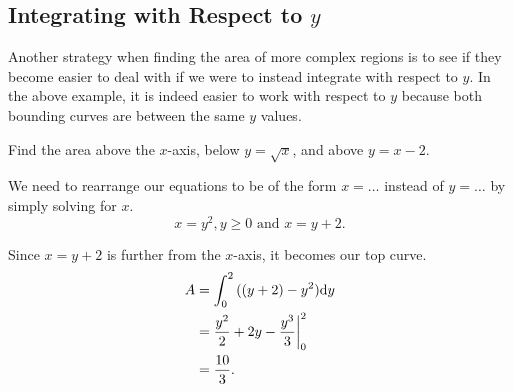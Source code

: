 \subsection{Integrating with Respect to $y$}
Another strategy when finding the area of more complex regions is to see if they become easier to deal with if we were to instead integrate with respect to $y$.
In the above example, it is indeed easier to work with respect to $y$ because both bounding curves are between the same $y$ values.
\begin{example}
	Find the area above the $x$-axis, below $y=\sqrt{x}$, and above $y=x-2$.
\end{example}
\begin{answer}
	We need to rearrange our equations to be of the form $x=\ldots$ instead of $y=\ldots$ by simply solving for $x$.
	\begin{equation*}
		x = y^2, y\geq 0 \text{ and } x = y+2.
	\end{equation*}
	
	Since $x=y+2$ is further from the $x$-axis, it becomes our top curve.
	\begin{align*}
		A &= \int_{0}^{2}{((y+2)-y^2)\mathrm{d} y} \\
		&= \frac{y^2}{2} + 2y - \frac{y^3}{3} \biggr\rvert_0^2 \\
		&= \frac{10}{3}.
	\end{align*}
\end{answer}